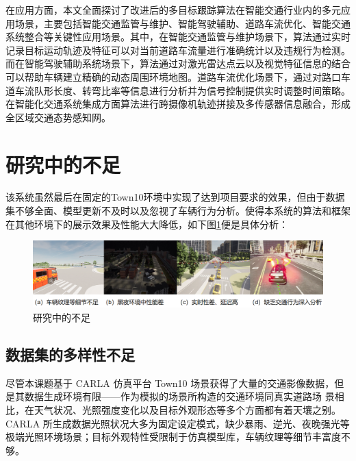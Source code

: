 在应用方面，本文全面探讨了改进后的多目标跟踪算法在智能交通行业内的多元应用场景，主要包括智能交通监管与维护、智能驾驶辅助、道路车流优化、智能交通系统整合等关键性应用场景。其中，在智能交通监管与维护场景下，算法通过实时记录目标运动轨迹及特征可以对当前道路车流量进行准确统计以及违规行为检测\cite{tongji2021vision}。而在智能驾驶辅助系统场景下，算法通过对激光雷达点云以及视觉特征信息的结合可以帮助车辆建立精确的动态周围环境地图\cite{baidu2022sensor}。道路车流优化场景下，通过对路口车道车流队形长度、转弯比率等信息进行分析并为信号控制提供实时调整时间策略\cite{path2020optimization}。在智能化交通系统集成方面算法进行跨摄像机轨迹拼接及多传感器信息融合，形成全区域交通态势感知网\cite{chen2023integration}。



\section{研究中的不足}


该系统虽然最后在固定的Town10环境中实现了达到项目要求的效果，但由于数据集不够全面、模型更新不及时以及忽视了车辆行为分析。使得本系统的算法和框架在其他环境下的展示效果及性能大大降低，如下图\ref{fig:p46}便是具体分析：




\begin{figure}[htbp] %
	\centering
	\includegraphics[width=1\textwidth]{p46} %
	\caption{研究中的不足} %
	\label{fig:p46} %
\end{figure}



\subsection{数据集的多样性不足}

尽管本课题基于 CARLA 仿真平台 Town10 场景获得了大量的交通影像数据，但是其数据生成环境有限——作为模拟的场景所构造的交通环境同真实道路场 景相比，在天气状况、光照强度变化以及目标外观形态等多个方面都有着天壤之别。CARLA 所生成数据光照状况大多为固定设定模式，缺少暴雨、逆光、夜晚强光等极端光照环境场景；目标外观特性受限制于仿真模型库，车辆纹理等细节丰富度不够。


